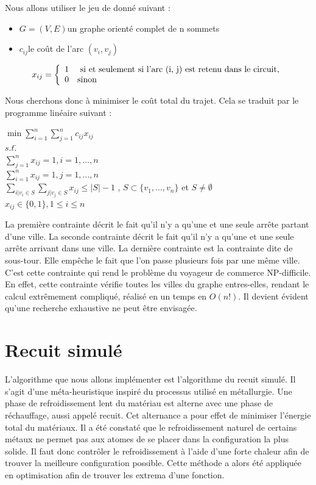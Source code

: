 \documentclass{article}
\begin{document}
Nous allons utiliser le jeu de donné suivant :
\medskip
\begin{itemize}
\item{$G = (V, E)$}{un graphe orienté complet de n sommets}\smallskip
\item{$c_{ij}$}{le coût de l'arc $(v_{i}, v_{j})$}
\end{itemize}

\[ x_{ij} = \left\{
\begin{array}{l l}
	1 \quad $ si et seulement si l'arc (i, j) est retenu dans le circuit,$\\
	0 \quad $sinon$
\end{array} \right.\]

Nous cherchons donc à minimiser le coût total du trajet. Cela se traduit par le programme linéaire suivant :

\begin{tabbing}
$\min\sum_{i=1}^{n}\sum_{j=1}^{n}c_{ij}x_{ij}$\\
$s.t.$\=
\+\\
$\sum_{j=1}^{n}x_{ij} = 1, i = 1,\dots, n$\\
$\sum_{i=1}^{n}x_{ij} = 1, j = 1,\dots, n$\\
$\sum_{i|v_{i} \in S}\sum_{j|v_{j} \in S}x_{ij} \leq |S| - 1$ , $S \subset \{v_{1},\dots, v_{n}\}$ et $S \neq \emptyset$\\
$x_{ij} \in \{0,1\}, 1 \leq i \leq n$
\end{tabbing}

La première contrainte décrit le fait qu'il n'y a qu'une et une seule arrête partant d'une ville.
La seconde contrainte décrit le fait qu'il n'y a qu'une et une seule arrête arrivant dans une ville.
La dernière contrainte est la contrainte dite de sous-tour.
Elle empêche le fait que l'on passe plusieurs fois par une même ville.
C'est cette contrainte qui rend le problème du voyageur de commerce NP-difficile.
En effet, cette contrainte vérifie toutes les villes du graphe entres-elles, rendant le calcul extrêmement compliqué, réalisé en un temps en $O(n!)$.
Il devient évident qu'une recherche exhaustive ne peut être envisagée.

\section{Recuit simulé}

L'algorithme que nous allons implémenter est l'algorithme du recuit simulé.
Il s'agit d'une méta-heuristique inspiré du processus utilisé en métallurgie.
Une phase de refroidissement lent du matériau est alterne avec une phase de réchauffage, aussi appelé recuit.
Cet alternance a pour effet de minimiser l'énergie total du matériaux.
Il a été constaté que le refroidissement naturel de certains métaux ne permet pas aux atomes de se placer dans la configuration la plus solide.
Il faut donc contrôler le refroidissement à l'aide d'une forte chaleur afin de trouver la meilleure configuration possible.
Cette méthode a alors été appliquée en optimisation afin de trouver les extrema d'une fonction.
\end{document}
